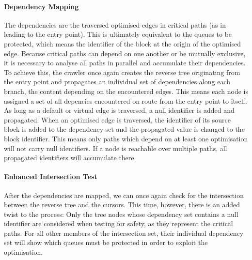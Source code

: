 \paragraph{Dependency Mapping}
The dependencies are the traversed optimised edges in critical paths (as in leading to the entry point).
This is ultimately equivalent to the queues to be protected, which means the identifier of the block at the origin of the optimised edge. Because critical paths can depend on one another or be mutually exclusive, it is necessary to analyse all paths in parallel and accumulate their dependencies. To achieve this, the crawler once again creates the reverse tree originating from the entry point and propagates an individual set of dependencies along each branch, the content depending on the encountered edges. This means each node is assigned a set of all depencies encountered on route from the entry point to itself.
As long as a default or virtual edge is traversed, a null identifier is added and propagated. When an optimised edge is traversed, the identifier of its source block is added to the dependency set and the propagated value is changed to the block identifier. This means only paths which depend on at least one optimisation will not carry null identifiers. If a node is reachable over multiple paths, all propagated identifiers will accumulate there.

\paragraph{Enhanced Intersection Test}
After the dependencies are mapped, we can once again check for the intersection between the reverse tree and the cursors. This time, however, there is an added twist to the process: Only the tree nodes whose dependency set contains a null identifier are considered when testing for safety, as they represent the critical paths. For all other members of the intersection set, their individual dependency set will show which queues must be protected in order to exploit the optimisation.


